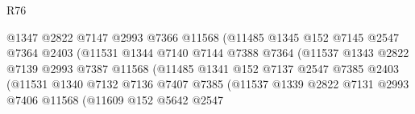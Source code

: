\begin{lexlean}{R76}
\begin{coremodule}
                                        @1347
                                        @2822
                                        @7147
                                        @2993
                                        @7366
                                        @11568
                                        (@11485
                                          @1345
                                          @152
                                          @7145
                                          @2547
                                          @7364
                                          @2403
                                          (@11531
                                            @1344
                                            @7140
                                            @7144
                                            @7388
                                            @7364
                                            (@11537
                                              @1343
                                              @2822
                                              @7139
                                              @2993
                                              @7387
                                              @11568
                                              (@11485
                                                @1341
                                                @152
                                                @7137
                                                @2547
                                                @7385
                                                @2403
                                                (@11531
                                                  @1340
                                                  @7132
                                                  @7136
                                                  @7407
                                                  @7385
                                                  (@11537
                                                    @1339
                                                    @2822
                                                    @7131
                                                    @2993
                                                    @7406
                                                    @11568
                                                    (@11609
                                                      @152
                                                      @5642
                                                      @2547

\end{coremodule}
\end{lexlean}
